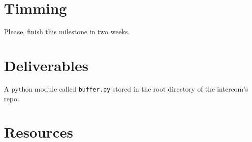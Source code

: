 \section{Timming}

Please, finish this milestone in two weeks.

\section{Deliverables}

A python module called \texttt{buffer.py} stored in the root directory
of the intercom's repo.

\section{Resources}


